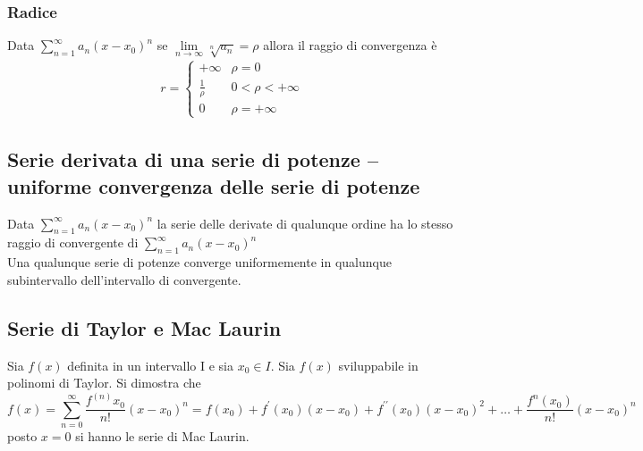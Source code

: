 \subsubsection{Radice}
Data $\displaystyle\sum_{n=1}^\infty a_n(x-x_0)^n$ se $\lim\limits_{n\to\infty}\sqrt[n]{a_n}=\rho$ allora il raggio di convergenza è 
\begin{eqnarray*}
  r=\begin{cases}
      +\infty & \rho=0\\
      \frac{1}{\rho} &0< \rho <+\infty\\
      0 & \rho=+\infty
    \end{cases}
\end{eqnarray*}
\subsection{Serie derivata di una serie di potenze -- uniforme convergenza delle serie
  di potenze}
Data $\displaystyle\sum_{n=1}^\infty a_n(x-x_0)^n$ la serie delle derivate di qualunque
ordine ha lo stesso raggio di convergente di $\displaystyle\sum_{n=1}^\infty a_n(x-x_0)^n$
\\
Una qualunque serie di potenze converge uniformemente in qualunque subintervallo dell'intervallo di convergente.
\subsection{Serie di Taylor e Mac Laurin}
\begin{tasks}
  \task Sia $f(x)$ definita in un intervallo I e sia $x_0\in I$.
  \task Sia $f(x)$ sviluppabile in polinomi di Taylor.
  \task Si dimostra che
  \begin{equation*}
    f(x)=\displaystyle\sum_{n=0}^{\infty}\frac{f^{(n)}x_0}{n!}(x-x_0)^n
    =f(x_0)+f^\prime(x_0)(x-x_0)+f^{\prime\prime}(x_0)(x-x_0)^2+\dots+\frac{f^{n}(x_0)}{n!}(x-x_0)^n
  \end{equation*}
  posto $x=0$ si hanno  le serie di Mac Laurin.
\end{tasks}
